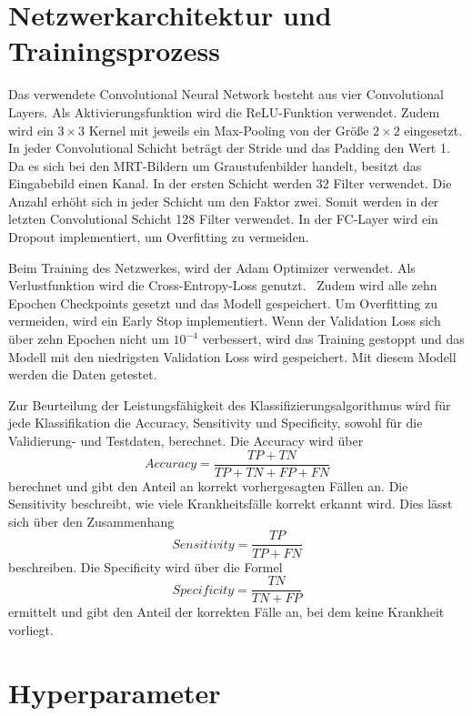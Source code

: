 \section{Netzwerkarchitektur und Trainingsprozess}

Das verwendete Convolutional Neural Network besteht aus vier Convolutional Layers. Als Aktivierungsfunktion wird die ReLU-Funktion verwendet.
Zudem wird ein $3 \times 3$ Kernel mit jeweils ein Max-Pooling von der Größe $2 \times 2$ eingesetzt. 
In jeder Convolutional Schicht beträgt der Stride und das Padding den Wert 1.
Da es sich bei den MRT-Bildern um Graustufenbilder handelt, besitzt das Eingabebild einen Kanal. 
In der ersten Schicht werden 32 Filter verwendet.
Die Anzahl erhöht sich in jeder Schicht um den Faktor zwei.
Somit werden in der letzten Convolutional Schicht 128 Filter verwendet.
In der FC-Layer wird ein Dropout implementiert, um Overfitting zu vermeiden.

Beim Training des Netzwerkes, wird der Adam Optimizer verwendet. 
Als Verlustfunktion wird die Cross-Entropy-Loss genutzt.~\cite{pytorchCrossEntropy}
Zudem wird alle zehn Epochen Checkpoints gesetzt und das Modell gespeichert.
Um Overfitting zu vermeiden, wird ein Early Stop implementiert. Wenn der Validation Loss sich über zehn Epochen nicht um $10^{-4}$
verbessert, wird das Training gestoppt und das Modell mit den niedrigsten Validation Loss wird gespeichert.
Mit diesem Modell werden die Daten getestet.

Zur Beurteilung der Leistungsfähigkeit des Klassifizierungsalgorithmus wird für jede Klassifikation die Accuracy, 
Sensitivity und Specificity, sowohl für die Validierung- und Testdaten, berechnet.
Die Accuracy wird über
\begin{equation}
  Accuracy = \frac{TP + TN}{TP + TN + FP + FN}
\end{equation}
berechnet und gibt den Anteil an korrekt vorhergesagten Fällen an. 
Die Sensitivity beschreibt, wie viele Krankheitsfälle korrekt erkannt wird. 
Dies lässt sich über den Zusammenhang
\begin{equation}
  Sensitivity = \frac{TP}{TP + FN}
\end{equation}
beschreiben.
Die Specificity wird über die Formel
\begin{equation}
  Specificity = \frac{TN}{TN + FP}
\end{equation}
ermittelt und gibt den Anteil der korrekten Fälle an, bei dem keine Krankheit vorliegt.%

\section{Hyperparameter}\label{sec:Hyperparameter}

